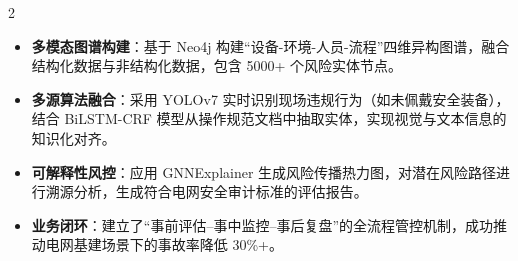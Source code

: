 \documentclass[10pt,a4paper,withhyper,normalphoto]{altacv}
\begin{document}
\begin{paracol}{2}



\begin{itemize}
    \item \textbf{多模态图谱构建}：基于 Neo4j 构建“设备-环境-人员-流程”四维异构图谱，融合结构化数据与非结构化数据，包含 5000+ 个风险实体节点。
    \item \textbf{多源算法融合}：采用 YOLOv7 实时识别现场违规行为（如未佩戴安全装备），结合 BiLSTM-CRF 模型从操作规范文档中抽取实体，实现视觉与文本信息的知识化对齐。
    \item \textbf{可解释性风控}：应用 GNNExplainer 生成风险传播热力图，对潜在风险路径进行溯源分析，生成符合电网安全审计标准的评估报告。
    \item \textbf{业务闭环}：建立了“事前评估--事中监控--事后复盘”的全流程管控机制，成功推动电网基建场景下的事故率降低 30\%+。
\end{itemize}



\end{paracol}
\end{document}
